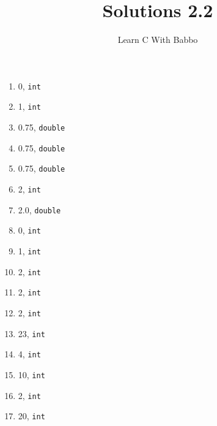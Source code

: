 \documentclass{article}
\begin{document}
\title{Solutions 2.2}
\author{Learn C With Babbo}
\date{}
\maketitle

\begin{enumerate}
\item 0, \verb|int|
\item 1, \verb|int|
\item 0.75, \verb|double|
\item 0.75, \verb|double|
\item 0.75, \verb|double|
\item 2, \verb|int|
\item 2.0, \verb|double|
\item 0, \verb|int|
\item 1, \verb|int|
\item 2, \verb|int|
\item 2, \verb|int|
\item 2, \verb|int|
\item 23, \verb|int|
\item 4, \verb|int|
\item 10, \verb|int|
\item 2, \verb|int|
\item 20, \verb|int|
\end{enumerate}
\end{document}
